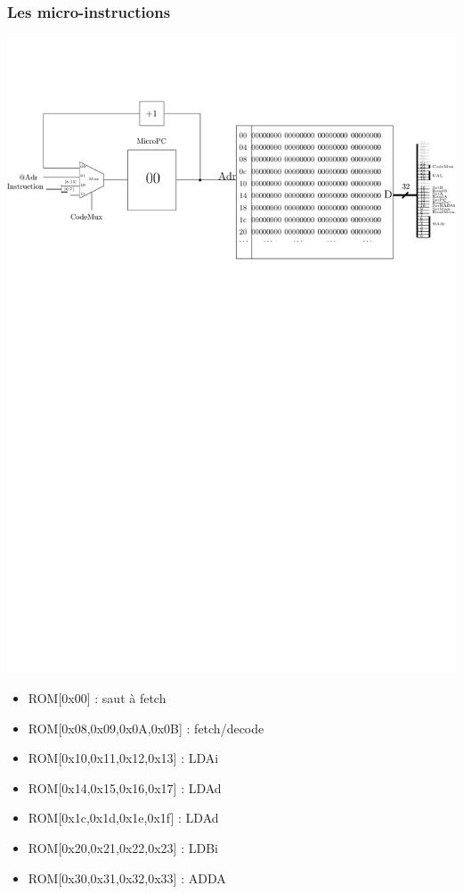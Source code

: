 \documentclass{beamer}
\begin{document}
\begin{frame}
\frametitle{Les micro-instructions}
\centering\includegraphics[width=0.6\linewidth]{Figs/sequenceur_micro.pdf}\\

\begin{small}
\begin{itemize}
\item ROM[0x00] : saut à fetch
\item ROM[0x08,0x09,0x0A,0x0B] : fetch/decode
\item ROM[0x10,0x11,0x12,0x13] : LDAi
\item ROM[0x14,0x15,0x16,0x17] : LDAd
\item ROM[0x1c,0x1d,0x1e,0x1f] : LDAd
\item ROM[0x20,0x21,0x22,0x23] : LDBi
\item ROM[0x30,0x31,0x32,0x33] : ADDA
\end{itemize}
\end{small}
\end{frame}
\end{document}
